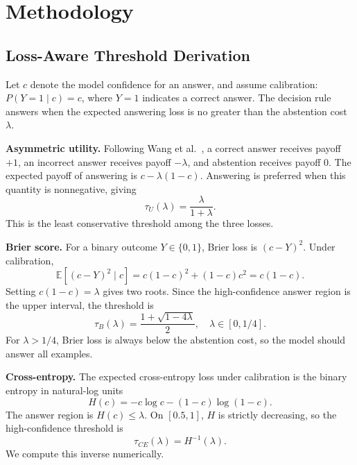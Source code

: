 \documentclass[letterpaper,10pt,twocolumn]{article}
\begin{document}
\section{Methodology}

\subsection{Loss-Aware Threshold Derivation}

Let $c$ denote the model confidence for an answer, and assume calibration:
$P(Y=1\mid c)=c$, where $Y=1$ indicates a correct answer. The decision rule
answers when the expected answering loss is no greater than the abstention
cost $\lambda$.

\textbf{Asymmetric utility.}
Following Wang et al.~\cite{wang2026}, a correct answer receives payoff $+1$,
an incorrect answer receives payoff $-\lambda$, and abstention receives payoff
$0$. The expected payoff of answering is $c-\lambda(1-c)$. Answering is
preferred when this quantity is nonnegative, giving
\begin{equation}
    \tau_U(\lambda)=\frac{\lambda}{1+\lambda}.
\end{equation}
This is the least conservative threshold among the three losses.

\textbf{Brier score.}
For a binary outcome $Y\in\{0,1\}$, Brier loss is $(c-Y)^2$. Under calibration,
\begin{equation}
    \mathbb{E}[(c-Y)^2\mid c]=c(1-c)^2+(1-c)c^2=c(1-c).
\end{equation}
Setting $c(1-c)=\lambda$ gives two roots. Since the high-confidence answer
region is the upper interval, the threshold is
\begin{equation}
    \tau_B(\lambda)=\frac{1+\sqrt{1-4\lambda}}{2},\quad
    \lambda\in[0,1/4].
\end{equation}
For $\lambda>1/4$, Brier loss is always below the abstention cost, so the
model should answer all examples.

\textbf{Cross-entropy.}
The expected cross-entropy loss under calibration is the binary entropy in
natural-log units
\begin{equation}
    H(c)=-c\log c-(1-c)\log(1-c).
\end{equation}
The answer region is $H(c)\leq\lambda$. On $[0.5,1]$, $H$ is strictly
decreasing, so the high-confidence threshold is
\begin{equation}
    \tau_{CE}(\lambda)=H^{-1}(\lambda).
\end{equation}
We compute this inverse numerically.
\end{document}
